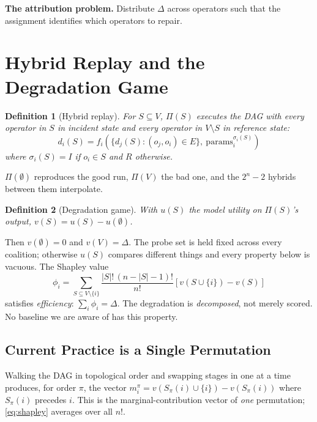 \documentclass[conference]{IEEEtran}
\newtheorem{definition}{Definition}
\begin{document}
\textbf{The attribution problem.} Distribute $\Delta$ across operators such that
the assignment identifies which operators to repair.

\section{Hybrid Replay and the Degradation Game}\label{sec:game}

\begin{definition}[Hybrid replay]
For $S \subseteq V$, $\Pi(S)$ executes the DAG with every operator in $S$ in
incident state and every operator in $V \setminus S$ in reference state:
\begin{equation}
d_i(S) = f_i\!\left(\{d_j(S) : (o_j,o_i)\in E\},\ \text{params}_i^{\sigma_i(S)}\right)
\end{equation}
where $\sigma_i(S) = I$ if $o_i \in S$ and $R$ otherwise.
\end{definition}

$\Pi(\emptyset)$ reproduces the good run, $\Pi(V)$ the bad one, and the $2^n-2$
hybrids between them interpolate.

\begin{definition}[Degradation game]
With $u(S)$ the model utility on $\Pi(S)$'s output, $v(S) = u(S) - u(\emptyset)$.
\end{definition}

Then $v(\emptyset)=0$ and $v(V)=\Delta$. The probe set is held fixed across every
coalition; otherwise $u(S)$ compares different things and every property below is
vacuous. The Shapley value
\begin{equation}
\phi_i = \sum_{S \subseteq V\setminus\{i\}} \frac{|S|!\,(n-|S|-1)!}{n!}
         \left[v(S\cup\{i\}) - v(S)\right]
\label{eq:shapley}
\end{equation}
satisfies \emph{efficiency}: $\sum_i \phi_i = \Delta$. The degradation is
\emph{decomposed}, not merely scored. No baseline we are aware of has this
property.

\subsection{Current Practice is a Single Permutation}

Walking the DAG in topological order and swapping stages in one at a time
produces, for order $\pi$, the vector $m_i^\pi = v(S_\pi(i)\cup\{i\}) - v(S_\pi(i))$
where $S_\pi(i)$ precedes $i$. This is the marginal-contribution vector of
\emph{one} permutation; \eqref{eq:shapley} averages over all $n!$.
\end{document}
